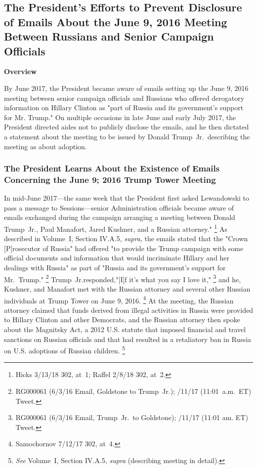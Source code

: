 {\subsection{The President's Efforts to Prevent Disclosure of Emails About the June 9, 2016 Meeting Between Russians and Senior Campaign Officials}

\begin{center}
\textbf{Overview}
\end{center}

By June 2017, the President became aware of emails setting up the June 9, 2016 meeting between senior campaign officials and Russians who offered derogatory information on Hillary Clinton as "part of Russia and its government's support for Mr. Trump."
On multiple occasions in late June and early July 2017, the President directed aides not to publicly disclose the emails, and he then dictated a statement about the meeting to be issued by Donald Trump~Jr.\ describing the meeting as about adoption.

\subsubsection{The President Learns About the Existence of Emails Concerning the June 9; 2016 Trump Tower Meeting}

In mid-June 2017---the same week that the President first asked Lewandowski to pass a message to Sessions---senior Administration officials became aware of emails exchanged during the campaign arranging a meeting between Donald Trump~Jr., Paul Manafort, Jared Kushner, and a Russian attorney."%
\footnote{Hicks 3/13/18 302, at~1;
Raffel 2/8/18 302, at~2.}
As described in Volume~I, Section IV.A.5, \textit{supra}, the emails stated that the "Crown [P]rosecutor of Russia" had offered "to provide the Trump campaign with some official documents and information that would incriminate Hillary and her dealings with Russia" as part of "Russia and its government's support for Mr.~Trump."%
\footnote{RG000061 (6/3/16 Email, Goldstone to Trump~Jr.);
/11/17 (11:01~a.m.~ET) Tweet.}
Trump~Jr.responded,"[I]f it's what you say I love it,"%
\footnote{RG000061 (6/3/16 Email, Trump~Jr.\ to Goldstone);
/11/17 (11:01 am. ET) Tweet.}
and he, Kushner, and Manafort met with the Russian attorney and several other Russian individuals at Trump Tower on June 9, 2016.%
\footnote{Samochornov 7/12/17 302, at~4.}
At the meeting, the Russian attorney claimed that funds derived from illegal activities in Russia were provided to Hillary Clinton and other Democrats, and the Russian attorney then spoke about the Magnitsky Act, a 2012 U.S. statute that imposed financial and travel sanctions on Russian officials and that had resulted in a retaliatory ban in Russia on U.S. adoptions of Russian children.%
\footnote{\textit{See} Volume~I, Section IV.A.5, \textit{supra} (describing meeting in detail).}

}
